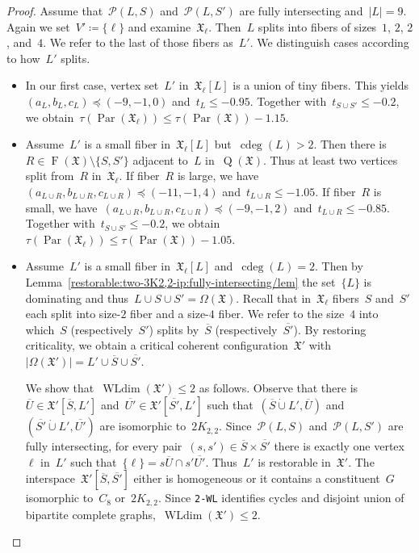 \documentclass[english,a4paper]{article}
\theoremstyle{plain}
\theoremstyle{definition}
\newcommand{\disjointUnion}{\ensuremath{\mathbin{\dot{\cup}}}}
\DeclareMathOperator{\Fibers}{F}
\newcommand{\coherentConfig}{\ensuremath{\mathfrak{X}}}
\newcommand{\fibers}[1]{\ensuremath{\Fibers \left( #1 \right)}}
\newcommand{\vertices}{\ensuremath{\Omega}}
\DeclareMathOperator*{\WLdim}{WLdim}
\newcommand{\wldim}[1]{\ensuremath{\WLdim\left(#1\right)}}
\newcommand{\wld}[1]{\texttt{#1-WL}}
\newcommand{\wltwo}{\wld{2}\xspace}
\DeclareMathOperator*{\Quotient}{Q}
\newcommand{\quotientGraph}[1]{\ensuremath{\Quotient(#1)}}
\DeclareMathOperator{\ColorDeg}{cdeg}
\newcommand{\colorDeg}[1]{\ensuremath{\ColorDeg\left(#1\right)}}
\newcommand{\equivalenceClasses}[1]{\ensuremath{\mathcal{P}(#1)}}
\DeclareMathOperator{\parameters}{Par}
\newcommand{\clique}[1]{\ensuremath{K_{#1}}}
\newcommand{\cycle}[1]{\ensuremath{C_{#1}}}
\newcommand{\disjointCliques}[2]{\ensuremath{#1 \clique{#2}}}
\begin{document}
\begin{proof}
    Assume that~$\equivalenceClasses{L,S}$ and~$\equivalenceClasses{L, S'}$ are fully intersecting and~$|L| = 9$.
    Again we set~$V' \coloneqq \{\ell\}$ and examine~$\coherentConfig_\ell$.
    Then~$L$ splits into fibers of sizes~$1$, $2$, $2$, and~$4$.
    We refer to the last of those fibers as~$L'$.
    We distinguish cases according to how~$L'$ splits.
    \begin{itemize}
        \item
        In our first case, vertex set~$L'$ in~$\coherentConfig_\ell[L]$ is a union of tiny fibers.
        This yields $(a_L,b_L, c_L) \preceq (-9,-1,0)$ and~$t_L \leq - 0.95$.
        Together with~$t_{S \cup S'} \leq - 0.2$, we obtain~$\tau(\parameters(\coherentConfig_\ell)) \leq \tau(\parameters(\coherentConfig))- 1.15$.
        \item
        Assume~$L'$ is a small fiber in~$\coherentConfig_\ell[L]$ but~$\colorDeg{L} > 2$.
        Then there is~$R \in \fibers{\coherentConfig} \setminus \{S,S'\}$ adjacent to~$L$ in~$\quotientGraph{\coherentConfig}$.
        Thus at least two vertices split from~$R$ in~$\coherentConfig_\ell$.
        If fiber~$R$ is large, we have~$(a_{L\cup R},b_{L\cup R}, c_{L\cup R}) \preceq (-11,-1,4)$ and~$t_{L\cup R} \leq - 1.05$.
        If fiber~$R$ is small, we have~$(a_{L\cup R},b_{L\cup R}, c_{L\cup R}) \preceq (-9,-1,2)$ and~$t_{L\cup R} \leq - 0.85$.
        Together with~$t_{S \cup S'} \leq - 0.2$, we obtain~$\tau(\parameters(\coherentConfig_\ell)) \leq \tau(\parameters(\coherentConfig))- 1.05$.
        \item
        Assume~$L'$ is a small fiber in~$\coherentConfig_\ell[L]$ and~$\colorDeg{L} = 2$.
        Then by Lemma~\ref{restorable:two-3K2,2-ip:fully-intersecting/lem} the set~$\{L\}$ is dominating and thus~$L \cup S \cup S' = \vertices(\coherentConfig)$.
        Recall that in~$\coherentConfig_\ell$ fibers~$S$ and~$S'$ each split into size-$2$ fiber and a size-$4$ fiber. We refer to the size~$4$ into which~$S$ (respectively~$S'$) splits by~$\overline{S}$ (respectively~$\overline{S'}$).
        By restoring criticality, we obtain a critical coherent configuration~$\coherentConfig'$ with~$|\vertices(\coherentConfig')| = L' \cup \overline{S} \cup \overline{S'}$.

        We show that~$\wldim{\coherentConfig'} \leq 2$ as follows.
        Observe that there is~$\overline{U} \in \coherentConfig'[\overline{S},L']$ and~$\overline{U'} \in \coherentConfig'[\overline{S'},L']$ such that~$(\overline{S} \disjointUnion L',\overline{U})$ and~$(\overline{S'} \disjointUnion L',\overline{U'})$ are isomorphic to~$\disjointCliques{2}{2,2}$.
        Since~$\equivalenceClasses{L,S}$ and~$\equivalenceClasses{L,S'}$ are fully intersecting, for every pair~$(s,s') \in \overline{S} \times \overline{S'}$ there is exactly one vertex~$\ell$ in~$L'$ such that~$\{\ell\} = s \overline{U} \cap s' \overline{U'}$.
        Thus~$L'$ is restorable in~$\coherentConfig'$.
        The interspace~$\coherentConfig'[\overline{S},\overline{S'}]$ either is homogeneous or it contains a constituent~$G$ isomorphic to~$\cycle{8}$ or~$\disjointCliques{2}{2,2}$.
        Since \wltwo identifies cycles and disjoint union of bipartite complete graphs,~$\wldim{\coherentConfig'} \leq 2$.


\end{itemize}
\end{proof}
\end{document}
